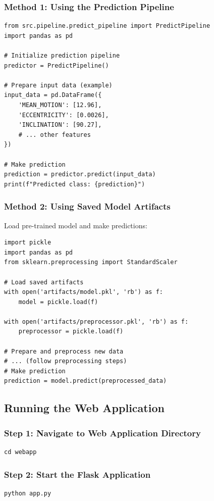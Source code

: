 \documentclass[12pt,a4paper]{article}
\begin{document}
\subsubsection{Method 1: Using the Prediction Pipeline}
\begin{lstlisting}
from src.pipeline.predict_pipeline import PredictPipeline
import pandas as pd

# Initialize prediction pipeline
predictor = PredictPipeline()

# Prepare input data (example)
input_data = pd.DataFrame({
    'MEAN_MOTION': [12.96],
    'ECCENTRICITY': [0.0026],
    'INCLINATION': [90.27],
    # ... other features
})

# Make prediction
prediction = predictor.predict(input_data)
print(f"Predicted class: {prediction}")
\end{lstlisting}

\subsubsection{Method 2: Using Saved Model Artifacts}
Load pre-trained model and make predictions:
\begin{lstlisting}
import pickle
import pandas as pd
from sklearn.preprocessing import StandardScaler

# Load saved artifacts
with open('artifacts/model.pkl', 'rb') as f:
    model = pickle.load(f)
    
with open('artifacts/preprocessor.pkl', 'rb') as f:
    preprocessor = pickle.load(f)

# Prepare and preprocess new data
# ... (follow preprocessing steps)
# Make prediction
prediction = model.predict(preprocessed_data)
\end{lstlisting}

\subsection{Running the Web Application}

\subsubsection{Step 1: Navigate to Web Application Directory}
\begin{verbatim}
cd webapp
\end{verbatim}

\subsubsection{Step 2: Start the Flask Application}
\begin{verbatim}
python app.py
\end{verbatim}
\end{document}
